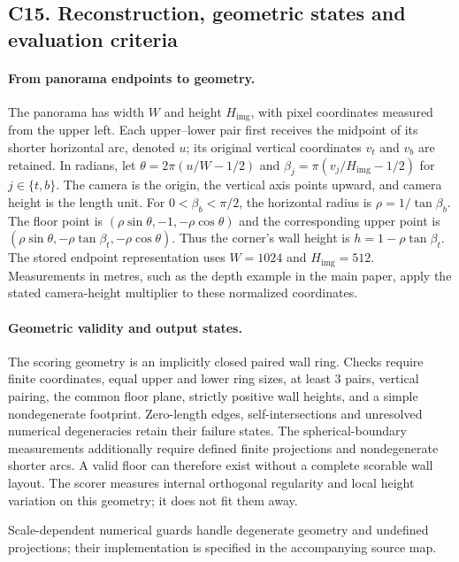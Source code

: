 \clearpage
\subsection*{C15. Reconstruction, geometric states and evaluation criteria}

\paragraph{From panorama endpoints to geometry.}
The panorama has width $W$ and height $H_{\mathrm{img}}$, with pixel coordinates
measured from the upper left. Each upper--lower pair first receives the
midpoint of its shorter horizontal arc, denoted $u$; its original vertical
coordinates $v_t$ and $v_b$ are retained. In radians, let
$\theta=2\pi(u/W-1/2)$ and
$\beta_j=\pi(v_j/H_{\mathrm{img}}-1/2)$ for $j\in\{t,b\}$.
The camera is the origin, the vertical axis points upward, and camera height
is the length unit. For $0<\beta_b<\pi/2$, the horizontal radius is
$\rho=1/\tan\beta_b$. The floor point is
$(\rho\sin\theta,-1,-\rho\cos\theta)$ and the corresponding upper point is
$(\rho\sin\theta,-\rho\tan\beta_t,-\rho\cos\theta)$.
Thus the corner's wall height is $h=1-\rho\tan\beta_t$.
The stored endpoint representation uses $W=1024$ and $H_{\mathrm{img}}=512$.
Measurements in metres, such as the depth example in the main paper, apply
the stated camera-height multiplier to these normalized coordinates.

\paragraph{Geometric validity and output states.}
The scoring geometry is an implicitly closed paired wall ring. Checks require
finite coordinates, equal upper and lower ring sizes, at least 3 pairs,
vertical pairing, the common floor plane, strictly positive wall heights,
and a simple nondegenerate footprint. Zero-length edges, self-intersections
and unresolved numerical degeneracies retain their failure states.
The spherical-boundary measurements additionally require defined finite
projections and nondegenerate shorter arcs. A valid floor can therefore
exist without a complete scorable wall layout. The scorer measures internal
orthogonal regularity and local height variation on this geometry; it does
not fit them away.

Scale-dependent numerical guards handle degenerate geometry and undefined projections; their implementation is specified in the accompanying source map.

